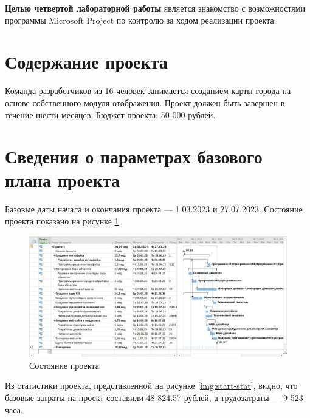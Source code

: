 \textbf{Целью четвертой лабораторной работы} является знакомство с возможностями программы Microsoft Project по контролю за ходом реализации проекта.

\section*{Содержание проекта}

Команда разработчиков из 16 человек занимается созданием карты города на основе собственного модуля отображения. Проект должен быть завершен в течение шести месяцев. Бюджет проекта: 50 000 рублей.

\section*{Сведения о параметрах базового плана проекта}

Базовые даты начала и окончания проекта --- 1.03.2023 и 27.07.2023. Состояние проекта показано на рисунке \ref{img:start-project}.

\begin{figure}[H]
	\begin{center}
		\includegraphics[scale=0.3]{inc/img/start-project.jpg}
	\end{center}
	\captionsetup{justification=centering}
	\caption{Состояние проекта}
	\label{img:start-project}
\end{figure}

Из статистики проекта, представленной на рисунке \ref{img:start-stat}, видно, что базовые затраты на проект составили 48 824.57 рублей, а трудозатраты --- 9 523 часа.


